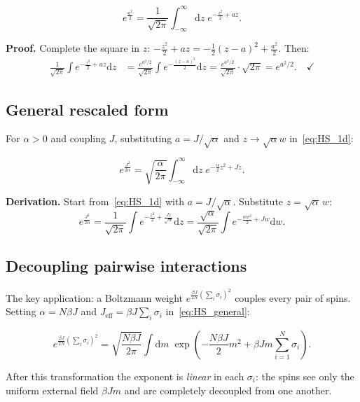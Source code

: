 \documentclass[justified,notoc]{tufte-handout}
\def\d{\mathrm{d}}
\begin{document}
\begin{keyresult}
\begin{equation}
  e^{\frac{a^2}{2}}=\frac{1}{\sqrt{2\pi}}\int_{-\infty}^{\infty}\d z\; e^{-\frac{z^2}{2}+az}.
  \label{eq:HS_1d}
\end{equation}
\end{keyresult}

\noindent\textbf{Proof.} Complete the square in $z$: $-\frac{z^2}{2}+az=-\frac{1}{2}(z-a)^2+\frac{a^2}{2}$. Then:
\begin{align}
  \frac{1}{\sqrt{2\pi}}\int e^{-\frac{z^2}{2}+az}\d z
  &=\frac{e^{a^2/2}}{\sqrt{2\pi}}\int e^{-\frac{(z-a)^2}{2}}\d z
  =\frac{e^{a^2/2}}{\sqrt{2\pi}}\cdot\sqrt{2\pi}=e^{a^2/2}.\quad\checkmark
\end{align}

\subsection{General rescaled form}

For $\alpha>0$ and coupling $J$, substituting $a=J/\sqrt{\alpha}$ and $z\to\sqrt{\alpha}w$ in~\eqref{eq:HS_1d}:
\begin{keyresult}
\begin{equation}
  e^{\frac{J^2}{2\alpha}}=\sqrt{\frac{\alpha}{2\pi}}\int_{-\infty}^{\infty}\d z\; e^{-\frac{\alpha}{2}z^2+Jz}.
  \label{eq:HS_general}
\end{equation}
\end{keyresult}

\noindent\textbf{Derivation.} Start from~\eqref{eq:HS_1d} with $a=J/\sqrt{\alpha}$. Substitute $z=\sqrt{\alpha}\,w$:
\begin{equation}
  e^{\frac{J^2}{2\alpha}}
  =\frac{1}{\sqrt{2\pi}}\int e^{-\frac{z^2}{2}+\frac{Jz}{\sqrt{\alpha}}}\d z
  =\frac{\sqrt{\alpha}}{\sqrt{2\pi}}\int e^{-\frac{\alpha w^2}{2}+Jw}\d w.
\end{equation}

\subsection{Decoupling pairwise interactions}

The key application: a Boltzmann weight $e^{\frac{\beta J}{2N}(\sum_i\sigma_i)^2}$ couples every pair of spins. Setting $\alpha=N\beta J$ and $J_\text{eff}=\beta J\sum_i\sigma_i$ in~\eqref{eq:HS_general}:
\begin{keyresult}
\begin{equation}
  e^{\frac{\beta J}{2N}\left(\sum_i\sigma_i\right)^2}
  =\sqrt{\frac{N\beta J}{2\pi}}\int\d m\;\exp\!\left(-\frac{N\beta J}{2}m^2+\beta Jm\sum_{i=1}^N\sigma_i\right).
  \label{eq:HS_decouple}
\end{equation}
\end{keyresult}
After this transformation the exponent is \emph{linear} in each $\sigma_i$: the spins see only the uniform external field $\beta Jm$ and are completely decoupled from one another.
\end{document}
